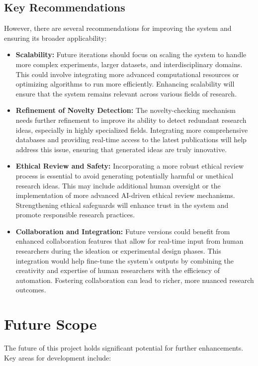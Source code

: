 \subsection{Key Recommendations}
However, there are several recommendations for improving the system and ensuring its broader applicability:
\begin{itemize}
\item \textbf{Scalability:} Future iterations should focus on scaling the system to handle more complex experiments, larger datasets, and interdisciplinary domains. This could involve integrating more advanced computational resources or optimizing algorithms to run more efficiently. Enhancing scalability will ensure that the system remains relevant across various fields of research.

\item \textbf{Refinement of Novelty Detection:} The novelty-checking mechanism needs further refinement to improve its ability to detect redundant research ideas, especially in highly specialized fields. Integrating more comprehensive databases and providing real-time access to the latest publications will help address this issue, ensuring that generated ideas are truly innovative.

\item \textbf{Ethical Review and Safety:} Incorporating a more robust ethical review process is essential to avoid generating potentially harmful or unethical research ideas. This may include additional human oversight or the implementation of more advanced AI-driven ethical review mechanisms. Strengthening ethical safeguards will enhance trust in the system and promote responsible research practices.

\item \textbf{Collaboration and Integration:} Future versions could benefit from enhanced collaboration features that allow for real-time input from human researchers during the ideation or experimental design phases. This integration would help fine-tune the system's outputs by combining the creativity and expertise of human researchers with the efficiency of automation. Fostering collaboration can lead to richer, more nuanced research outcomes.
\end{itemize}

\section{Future Scope}
The future of this project holds significant potential for further enhancements. Key areas for development include:


